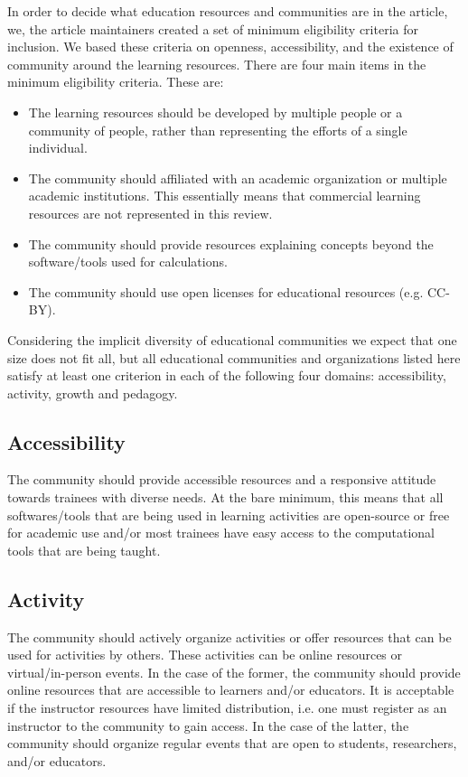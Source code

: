 \documentclass[9pt,review]{livecoms}
\begin{document}
In order to decide what education resources and communities are in the article, we, the article maintainers created a set of minimum eligibility criteria for inclusion.
We based these criteria on openness, accessibility, and the existence of community around the learning resources. There are four main items in the minimum eligibility criteria. These are:
\begin{itemize}
\item The learning resources should be developed by multiple people or a community of people, rather than representing the efforts of a single individual.
\item The community should affiliated with an academic organization or multiple academic institutions. This essentially means that commercial learning resources are not represented in this review.
\item The community should provide resources explaining concepts beyond the software/tools used for calculations.
\item The community should use open licenses for educational resources (e.g. CC-BY). 
\end{itemize}

Considering the implicit diversity of educational communities we expect that one size does not fit all, but all educational communities and organizations listed here satisfy at least one criterion in each of the following four domains: accessibility, activity, growth and pedagogy. %



\subsection{Accessibility}
The community should provide accessible resources and a responsive attitude towards trainees with diverse needs. At the bare minimum, this means that all softwares/tools that are being used in learning activities are open-source or free for academic use and/or most trainees have easy access to the computational tools that are being taught. 
\subsection{Activity}
The community should actively organize activities or offer resources that can be used for activities by others. These activities can be online resources or virtual/in-person events. In the case of the former, the community should provide online resources that are accessible to learners and/or educators. It is acceptable if the instructor resources have limited distribution, i.e. one must register as an instructor to the community to gain access. In the case of the latter, the community should organize regular events that are open to students, researchers, and/or educators.
\end{document}

